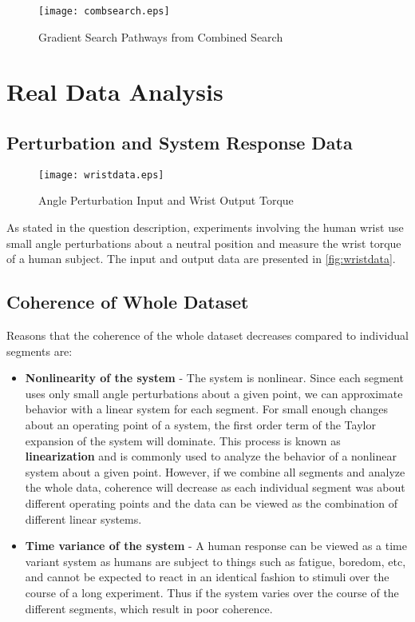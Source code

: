 \documentclass[11pt,a4paper]{article}
\begin{document}
\begin{figure}
    \centering
    \texttt{[image: combsearch.eps]}
    \caption{Gradient Search Pathways from Combined Search}
    \label{fig:combsearch}
\end{figure}

\section{Real Data Analysis}

\subsection{Perturbation and System Response Data}
\begin{figure}
    \centering
    \texttt{[image: wristdata.eps]}
    \caption{Angle Perturbation Input and Wrist Output Torque}
    \label{fig:wristdata}
\end{figure}
As stated in the question description, experiments involving the human wrist
use small angle perturbations about a neutral position and measure the wrist
torque of a human subject. The input and output data are presented in
\autoref{fig:wristdata}.


\subsection{Coherence of Whole Dataset}
Reasons that the coherence of the whole dataset decreases compared to
individual segments are:
\begin{itemize}
    \item \textbf{Nonlinearity of the system} - The system is nonlinear. Since
        each segment uses only small angle perturbations about a given point,
        we can approximate behavior with a linear system for each segment. For
        small enough changes about an operating point of a system, the first
        order term of the Taylor expansion of the system will dominate. This
        process is known as \textbf{linearization} and is commonly used to
        analyze the behavior of a nonlinear system about a given point.
        However, if we combine all segments and analyze the whole data,
        coherence will decrease as each individual segment was about different
        operating points and the data can be viewed as the combination of
        different linear systems.
    \item \textbf{Time variance of the system} - A human response can be viewed
        as a time variant system as humans are subject to things such as
        fatigue, boredom, etc, and cannot be expected to react in an identical
        fashion to stimuli over the course of a long experiment. Thus if the
        system varies over the course of the different segments, which result
        in poor coherence.
\end{itemize}
\end{document}
